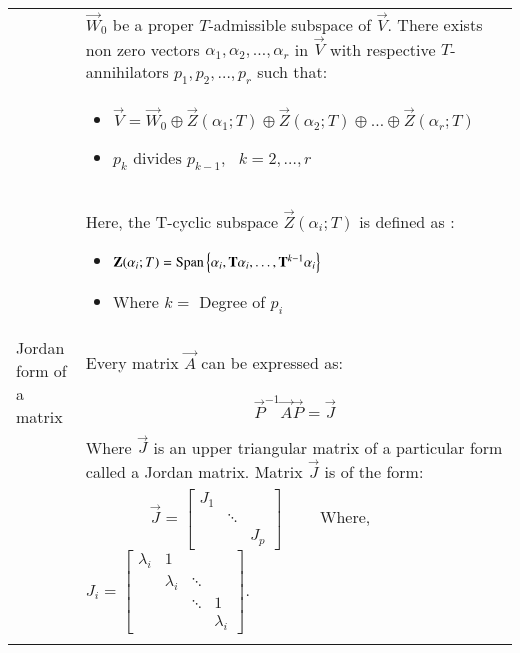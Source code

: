 \begin{longtable}{|p{4.5cm}|p{13.5cm}|}
	&$\vec{W}_0$ be a proper $T$-admissible subspace of $\vec{V}.$ There exists non zero vectors $\alpha_1,\alpha_2,\hdots,\alpha_r$ in $\vec{V}$ with respective $T$-annihilators $p_1,p_2,\hdots,p_r$ such that:\\
	&\begin{itemize}
        \item $\vec{V}=\vec{W}_0\oplus \vec{Z}(\alpha_1;T)\oplus \vec{Z}(\alpha_2;T)\oplus\hdots\oplus \vec{Z}(\alpha_r;T)$
        \item $p_k \text{ divides } p_{k-1},\text{ }k=2, \hdots,r$
    \end{itemize}\\
	&Here, the T-cyclic subspace $ \vec{Z}(\alpha_i;T)$ is defined as :
	\begin{itemize}
	    \item $\mathbf{Z}(\alpha_i;T)=\text{Span}\left\{\alpha_i,\mathbf{T}\alpha_i,\hdots,\mathbf{T}^{k-1}\alpha_i\right\}$
	    \item Where $k=$ Degree of $p_i$
	\end{itemize}\\
	\hline
    \multirow{3}{*}{Jordan form of a matrix} & \\
	&Every matrix $\vec{A}$ can be expressed as:\\
	&\begin{align}
	    \vec{P}^{-1}\vec{A}\vec{P} = \vec{J}
	\end{align}\\
	&Where $\vec{J}$ is an upper triangular matrix of a particular form called a Jordan matrix. Matrix $\vec{J}$ is of the form:\\
	&$\qquad\qquad \vec{J} = \begin{bmatrix}
J_1 & \;     & \; \\
\;  & \ddots & \; \\ 
\;  & \;     & J_p\end{bmatrix}\qquad$ Where, $J_i = 
\begin{bmatrix}
\lambda_i & 1            & \;     & \;  \\
\;        & \lambda_i    & \ddots & \;  \\
\;        & \;           & \ddots & 1   \\
\;        & \;           & \;     & \lambda_i       
\end{bmatrix}.$\\
\caption{}
\label{eq:solutions/7/4/5/tab0}
\end{longtable}

